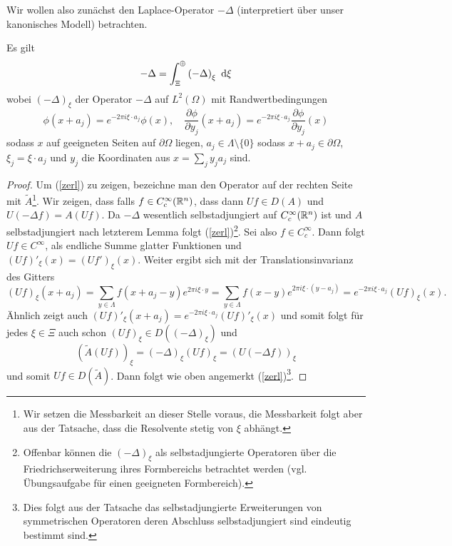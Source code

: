 \documentclass{mywork}
\renewcommand{\eqref}[1]{(\ref{#1})}
\begin{document}
Wir wollen also zunächst den Laplace-Operator $-\Delta$ (interpretiert über unser kanonisches Modell) betrachten.
\begin{lem}\label{laplace}
Es gilt
\begin{align}\label{zerl}
- \Delta = \int_{\Xi}^\oplus \left ( - \Delta \right )_\xi\, \dx[\xi]
\end{align}
wobei $(-\Delta)_\xi$ der Operator $- \Delta$ auf $L^2(\Omega)$ mit Randwertbedingungen
$$
\phi(x+a_j)=e^{-2\pi i\xi\cdot a_j} \phi(x), \quad \frac{\partial \phi}{\partial y_j} (x+a_j) = e^{-2\pi i \xi\cdot a_j} \frac{\partial \phi}{\partial y_j} (x)
$$
sodass $x$ auf geeigneten Seiten auf $\partial \Omega$ liegen, $a_j\in \Lambda\setminus\{0\}$ sodass $x+a_j\in \partial \Omega$, $\xi_j= \xi \cdot a_j$ und $y_j$ die Koordinaten aus $x= \sum_j y_j a_j$ sind.
\end{lem}

\begin{proof}
Um \eqref{zerl} zu zeigen, bezeichne man den Operator auf der rechten Seite mit $\tilde A$\footnote{Wir setzen die Messbarkeit an dieser Stelle voraus,  die Messbarkeit folgt aber aus der Tatsache, dass die Resolvente stetig von $\xi$ abhängt.}. Wir zeigen, dass falls $f\in C_c^\infty(\R^n)$, dass dann $Uf\in D(A)$ und $U(- \Delta f)= A(Uf)$.  Da $-\Delta$ wesentlich selbstadjungiert auf $C_c^\infty(\R^n)$ ist und $A$ selbstadjungiert nach letzterem Lemma folgt \eqref{zerl}\footnote{Offenbar können die $(-\Delta)_\xi$ als selbstadjungierte Operatoren über die Friedrichserweiterung ihres Formbereichs betrachtet werden (vgl. Übungsaufgabe für einen geeigneten Formbereich).}.  Sei also $f\in C_c^\infty$. Dann folgt $Uf\in C^\infty$, als endliche Summe glatter Funktionen und $(Uf)'_\xi (x) = (Uf')_\xi (x)$.  Weiter ergibt sich mit der Translationsinvarianz des Gitters
\[
(Uf)_\xi (x+a_j) = \sum_{y\in \Lambda}  f(x+ a_j-y)e^{2\pi i \xi \cdot y}= \sum_{y\in \Lambda}  f(x-y) e^{2\pi i \xi \cdot (y-a_j)}= e^{-2\pi i\xi\cdot a_j} (Uf)_\xi (x).
\]  
Ähnlich zeigt auch $(Uf)'_\xi (x+a_j) = e^{-2\pi i \xi \cdot a_j} (Uf)'_\xi (x)$ und somit folgt für jedes $\xi \in \Xi$ auch schon $(Uf)_\xi \in D((-\Delta)_\xi )$ und
\[
(\tilde A(Uf))_\xi=\left ( - \Delta \right )_\xi (Uf)_\xi = (U(- \Delta f))_\xi
\]
und somit $Uf \in D(\tilde A)$. Dann folgt wie oben angemerkt \eqref{zerl}\footnote{Dies folgt aus der Tatsache das selbstadjungierte Erweiterungen von symmetrischen Operatoren deren Abschluss selbstadjungiert sind eindeutig bestimmt sind.}.
\end{proof}
\end{document}
